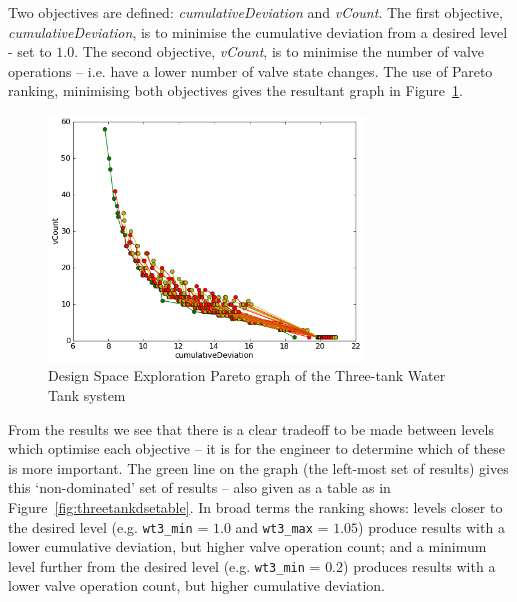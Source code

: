 Two objectives are defined: \textit{cumulativeDeviation} and \textit{vCount}. The first objective, \textit{cumulativeDeviation}, is to minimise the cumulative deviation from a desired level - set to $1.0$. The second objective, \textit{vCount}, is to minimise the number of valve operations -- i.e. have a lower number of valve state changes. The use of Pareto ranking, minimising both objectives gives the resultant graph in Figure~\ref{fig:threetankdse}.

\begin{figure}[h]
\begin{center}
\includegraphics[width=0.75\textwidth]{threetank/dse_pareto_graph.png}
\caption{Design Space Exploration Pareto graph of the Three-tank Water Tank system}
\label{fig:threetankdse}
\end{center}
\end{figure}

From the results we see that there is a clear tradeoff to be made between levels which optimise  each objective -- it is for the engineer to determine which of these is more important. The green line on the graph (the left-most set of results) gives this `non-dominated' set of results -- also given as a table as in Figure~\ref{fig:threetankdsetable}. In broad terms the ranking shows: levels closer to the desired level (e.g. \texttt{wt3\_min} = $1.0$ and \texttt{wt3\_max} = $1.05$) produce results with a lower cumulative deviation, but higher valve operation count; and a minimum level further from the desired level (e.g. \texttt{wt3\_min} = $0.2$) produces results with a lower valve operation count, but higher cumulative deviation.

